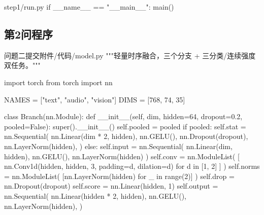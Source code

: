\begin{appendices}
\begin{Python}{step1/run.py}
if __name__ == "__main__":
    main()
\end{Python}

\vspace{2ex}

\subsection{第2问程序}
\vspace{-2ex}

\begin{Python}{问题二提交附件/代码/model.py}
"""轻量时序融合，三个分支 + 三分类/连续强度双任务。"""

import torch
from torch import nn

NAMES = ["text", "audio", "vision"]
DIMS = [768, 74, 35]


class Branch(nn.Module):
    def __init__(self, dim, hidden=64, dropout=0.2, pooled=False):
        super().__init__()
        self.pooled = pooled
        if pooled:
            self.stat = nn.Sequential(
                nn.Linear(dim * 2, hidden),
                nn.GELU(),
                nn.Dropout(dropout),
                nn.LayerNorm(hidden),
            )
        else:
            self.input = nn.Sequential(
                nn.Linear(dim, hidden), nn.GELU(), nn.LayerNorm(hidden)
            )
            self.conv = nn.ModuleList(
                [
                    nn.Conv1d(hidden, hidden, 3, padding=d, dilation=d)
                    for d in [1, 2]
                ]
            )
            self.norms = nn.ModuleList(
                [nn.LayerNorm(hidden) for _ in range(2)]
            )
            self.drop = nn.Dropout(dropout)
            self.score = nn.Linear(hidden, 1)
            self.output = nn.Sequential(
                nn.Linear(hidden * 2, hidden),
                nn.GELU(),
                nn.LayerNorm(hidden),
            )


\end{Python}
\end{appendices}
